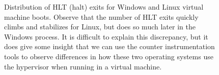 \documentclass[notitlepage]{article}
\begin{document}
\begin{figure}[htpb!]
\centering
{}\hfill
{}\hfill
\caption{Distribution of HLT (halt) exits for Windows and Linux virtual machine
boots. Observe that the number of HLT exits quickly climbs and stabilizes for
Linux, but does so much later in the Windows process. It is difficult to explain
this discrepancy, but it does give some insight that we can use the counter
instrumentation tools to observe differences in how these two operating systems
use the hypervisor when running in a virtual machine.}
\label{fig:winlinhlt}
\end{figure}
\end{document}
